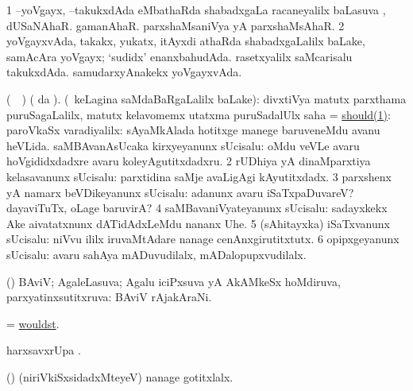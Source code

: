 \begin{center}
\bentry
{} 
\gl{\saupa}
\expl{}
\bmng
\bnum
\num{1} --yoVgayx, --takukxdAda eMbathaRda shabadxgaLa racaneyalilx baLasuva \saupa, \udA\  dUSaNAhaR.  gamanAhaR.  parxshaMsaniVya yA parxshaMsAhaR. 
\num{2} yoVgayxvAda, takakx, yukatx, itAyxdi athaRda shabadxgaLalilx baLake, \udA\  samAcAra yoVgayx; `sudidx' enanxbahudAda.  rasetxyalilx saMcarisalu takukxdAda.  samudarxyAnakekx yoVgayxvAda. 
\enum
\emng
\eentry

\bentry
{} 
\gl{\kirx}
\bmng
(\parxpu\ \Eva\ ) ( \kirx da \BU). (\kanmu\ keLagina saMdaBaRgaLalilx baLake): 
\bnum
{} divxtiVya matutx parxthama puruSagaLalilx, matutx kelavomemx utatxma puruSadalUlx saha = \hyperref{kandict_s.pdf}{S}{should(1)}{should(1)}: 
\banum
{} paroVkaSx varadiyalilx:  sAyaMkAlada hotitxge manege baruveneMdu avanu heVLida. 
 saMBAvanAsUcaka kirxyeyanunx sUcisalu:  oMdu veVLe avaru hoVgididxdadxre avaru koleyAgutitxdadxru. 
\eanum
\numie
\num{2} rUDhiya yA dinaMparxtiya kelasavanunx sUcisalu:  parxtidina saMje avaLigAgi kAyutitxdadx. 
\num{3} parxshenx yA namarx beVDikeyanunx sUcisalu:  adanunx avaru iSaTxpaDuvareV?  dayaviTuTx, oLage baruvirA? 
\num{4} saMBavaniVyateyanunx sUcisalu:  sadayxkekx Ake aivatatxnunx dATidAdxLeMdu nananx Uhe. 
\num{5} (sAhitayxka) iSaTxvanunx sUcisalu:  niVvu ililx iruvaMtAdare nanage cenAnxgirutitxtutx. 
\num{6} opipxgeyanunx sUcisalu:  avaru sahAya mADuvudilalx, mADalopupxvudilalx. 
\enum
\emng
\eentry

\bentry
{} 
\gl{\gu}
\expl{}
\bmng
(\hiV) BAviV; AgaleLasuva; Agalu iciPxsuva yA AkAMkeSx hoMdiruva, parxyatinxsutitxruva:  BAviV rAjakAraNi. 
\emng
\eentry

\bentry
{} 
\gl{\kirx}
\expl{}
\bmng
= \hyperlink{wouldst}{wouldst}. 
\emng
\eentry

\bentry
{} 
\bmng
harxsavxrUpa . 
\emng

\noindent
\gl{\pagu}
\expl{}
\bmng
{} (\AmA) (niriVkiSxsidadxMteyeV) nanage gotitxlalx. 
\emng
\eentry


\end{center}
